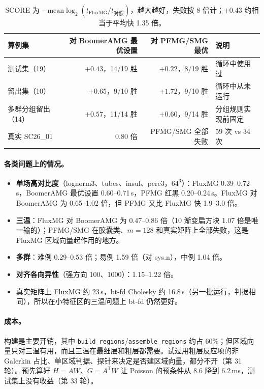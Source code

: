 \documentclass[11pt,a4paper]{ctexart}
\begin{document}
\begin{table}[H]
\centering\small
\begin{tabular}{lrrl}
\toprule
算例集 & 对 BoomerAMG 最优设置 & 对 PFMG/SMG 最优 & 说明 \\
\midrule
测试集（19） & $+0.43$，14/19 胜 & $+0.22$，8/19 胜 & 循环中使用过 \\
留出集（10） & $+0.65$，9/10 胜 & $+1.72$，9/10 胜 & 循环中从未运行 \\
多群分组留出（14） & $+0.57$，11/14 胜 & $+0.60$，9/14 胜 & 分组规则实现前固定 \\
真实 SC26\_01 & 0.80 倍 & PFMG/SMG 全部失败 & 59 次 vs 34 次 \\
\bottomrule
\end{tabular}
\caption{SCORE 为 $-\mathrm{mean}\log_2(t_\text{FluxMG}/t_\text{对照})$，越大越好，失败按 8 倍计；$+0.43$ 约相当于平均快 1.35 倍。}
\end{table}

\paragraph{各类问题上的情况。}
\begin{itemize}
\item \textbf{单场高对比度}（lognorm3、tubes、insul、perc3，$64^3$）：FluxMG 0.39--0.72\,s，BoomerAMG 最优设置 0.60--0.71\,s，PFMG 红黑 0.20--0.24\,s。FluxMG 对 BoomerAMG 为 0.65--1.02 倍，但 PFMG 又比 FluxMG 快 1.9--3.0 倍。
\item \textbf{三温}：FluxMG 对 BoomerAMG 为 0.47--0.86 倍（10 渐变扁方块 1.07 倍是唯一输的）；PFMG/SMG 在胶囊类、$m=128$ 和真实矩阵上全部失败，这是 FluxMG 区域向量起作用的地方。
\item \textbf{多群}：难例 0.29--0.53 倍；易例 1.59 倍（对 sys.n），中例 1.04 倍。
\item \textbf{对齐各向异性}（强方向 100、1000）：1.15--1.22 倍。
\item 真实矩阵上 FluxMG 约 23\,s，bt-fd Cholesky 约 16.8\,s（另一批运行，判据相同），所以在小特征区的三温问题上 bt-fd 仍然更好。
\end{itemize}

\paragraph{成本。}构建是主要开销，其中 \texttt{build\_regions}/\texttt{assemble\_regions} 约占 60\%；但区域向量只对三温有用，而且三温在最细层和粗层都需要。试过用粗层反应项的非 Galerkin 占比、单区域判据、探针来决定是否建区域向量，都分不开（第 31 轮）。预先算好 $H=AW$、$G=A^{\mathsf T}W$ 让 Poisson 的预条件从 8.6 降到 6.2\,ms，测试集上没有收益（第 33 轮）。
\end{document}
